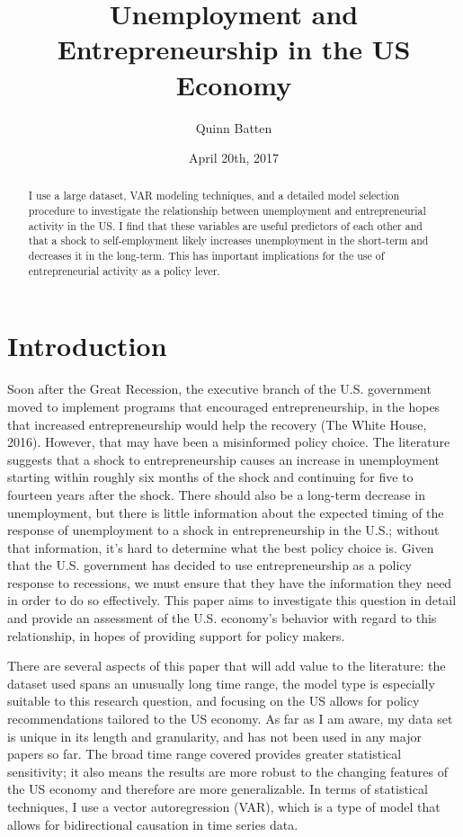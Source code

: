 \documentclass[]{ecca}
\title{Unemployment and Entrepreneurship in the US Economy}
\author{Quinn Batten}
\date{April 20th, 2017}
\begin{document}
\maketitle

\begin{abstract}

I use a large dataset, VAR modeling techniques, and a detailed model selection procedure to investigate the relationship between unemployment and entrepreneurial activity in the US. I find that these variables are useful predictors of each other and that a shock to self-employment likely increases unemployment in the short-term and decreases it in the long-term. This has important implications for the use of entrepreneurial activity as a policy lever.

\end{abstract}

\section*{Introduction}
Soon after the Great Recession, the executive branch of the U.S. government moved to implement programs that encouraged entrepreneurship, in the hopes that increased entrepreneurship would help the recovery (The White House, 2016). However, that may have been a misinformed policy choice. The literature suggests that a shock to entrepreneurship causes an increase in unemployment starting within roughly six months of the shock and continuing for five to fourteen years after the shock. There should also be a long-term decrease in unemployment, but there is little information about the expected timing of the response of unemployment to a shock in entrepreneurship in the U.S.; without that information, it's hard to determine what the best policy choice is. Given that the U.S. government has decided to use entrepreneurship as a policy response to recessions, we must ensure that they have the information they need in order to do so effectively. This paper aims to investigate this question in detail and provide an assessment of the U.S. economy's behavior with regard to this relationship, in hopes of providing support for policy makers. 

There are several aspects of this paper that will add value to the literature: the dataset used spans an unusually long time range, the model type is especially suitable to this research question, and focusing on the US allows for policy recommendations tailored to the US economy. As far as I am aware, my data set is unique in its length and granularity, and has not been used in any major papers so far. The broad time range covered provides greater statistical sensitivity; it also means the results are more robust to the changing features of the US economy and therefore are more generalizable. In terms of statistical techniques, I use a vector autoregression (VAR), which is a type of model that allows for bidirectional causation in time series data.
\end{document}
